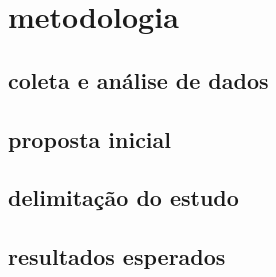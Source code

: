 \chapter[METODOLOGIA]{\textbf {metodologia}}

\section[COLETA E ANÁLISE DE DADOS]{coleta e análise de dados}

\section[PROPOSTA INICIAL]{proposta inicial}

\section[DELIMITAÇÃO DO ESTUDO]{delimitação do estudo}

\section[RESULTADOS ESPERADOS]{resultados esperados}